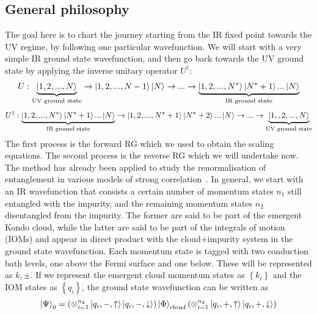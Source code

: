 \subsection{General philosophy}
The goal here is to chart the journey starting from the IR fixed point towards the UV regime, by following one particular wavefunction. We will start with a very simple IR ground state wavefunction, and then go back towards the UV ground state by applying the inverse unitary operator \(U^\dagger\):
\begin{equation*}\begin{aligned}
	U : \underbrace{\ket{1,2,...,N}}_\text{UV ground state} \rightarrow \ket{1,2,...,N-1}\ket{N} \rightarrow ... \rightarrow \underbrace{\ket{1,2,...,N^*}\ket{N^*+1}...\ket{N}}_\text{IR ground state}
\end{aligned}\end{equation*}
\begin{equation*}\begin{aligned}
	U^\dagger : \underbrace{\ket{1,2,...,N^*}\ket{N^*+1}...\ket{N}}_\text{IR ground state} \rightarrow \ket{1,2,...,N^*+1}\ket{N^*+2}...\ket{N} \rightarrow ... \rightarrow\underbrace{\ket{1,,2,...,N}}_\text{UV ground state}
\end{aligned}\end{equation*}
The first process is the forward RG which we used to obtain the scaling equations.
The second process is the reverse RG which we will undertake now. The method has already been applied to study the renormalisation of entanglement in various models of strong correlation~\cite{siddharthacpi,anirban_kondo,anirban_mott_ent}.
In general, we start with an IR wavefunction that consists a certain number of momentum states \(n_1\) still entangled with the impurity, and the remaining momentum states \(n_2\) disentangled from the impurity.
The former are said to be part of the emergent Kondo cloud, while the latter are said to be part of the integrals of motion (IOMs) and appear in direct product with the cloud+impurity system in the ground state wavefunction.
Each momentum state is tagged with two conduction bath levels, one above the Fermi surface and one below.
These will be represented as \(k,\pm\). If we represent the emergent cloud momentum states as \(\left\{k_i\right\} \) and the IOM states as \(\left\{q_i\right\}\), the ground state wavefunction can be written as 
\begin{equation}\begin{aligned}
	\ket{\Psi}_0 = \left(\otimes_{i=1}^{n_2}\ket{q_i,-,\uparrow}\ket{q_i,-,\downarrow}\right)\ket{\Phi}_\text{cloud}\left(\otimes_{i=1}^{n_2}\ket{q_i,+,\uparrow}\ket{q_i,+,\downarrow}\right)
\end{aligned}\end{equation}
